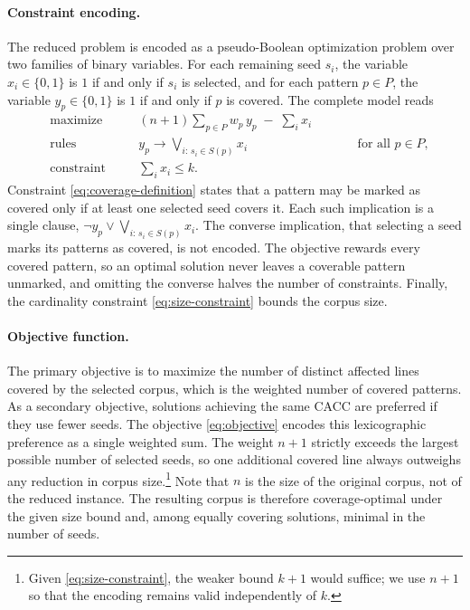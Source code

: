 \paragraph{Constraint encoding.}
The reduced problem is encoded as a pseudo-Boolean optimization problem over two families of binary variables.
For each remaining seed $s_i$, the variable $x_i\in\{0,1\}$ is $1$ if and only if $s_i$ is selected, and for each pattern $p\in P$, the variable $y_p\in\{0,1\}$ is $1$ if and only if $p$ is covered.
The complete model reads
\begin{subequations}
  \label{eq:cpsat-model}
  \begin{alignat}{3}
    &\text{maximize}   &\quad& (n+1)\sum_{p\in P} w_p\, y_p \;-\; \sum_{i} x_i
      \label{eq:objective} \\
    &\text{rules}      &     & y_p \rightarrow \bigvee_{i:\,s_i\in S(p)} x_i
      &\qquad& \text{for all } p\in P,
      \label{eq:coverage-definition} \\
    &\text{constraint} &     & \sum_{i} x_i \leq k.
      \label{eq:size-constraint}
  \end{alignat}
\end{subequations}
Constraint \eqref{eq:coverage-definition} states that a pattern may be marked as covered only if at least one selected seed covers it.
Each such implication is a single clause, $\lnot y_p \lor \bigvee_{i:\,s_i\in S(p)} x_i$.
The converse implication, that selecting a seed marks its patterns as covered, is not encoded.
The objective rewards every covered pattern, so an optimal solution never leaves a coverable pattern unmarked, and omitting the converse halves the number of constraints.
Finally, the cardinality constraint \eqref{eq:size-constraint} bounds the corpus size.

\paragraph{Objective function.}
The primary objective is to maximize the number of distinct affected lines covered by the selected corpus, which is the weighted number of covered patterns.
As a secondary objective, solutions achieving the same \ac{CACC} are preferred if they use fewer seeds.
The objective \eqref{eq:objective} encodes this lexicographic preference as a single weighted sum.
The weight $n+1$ strictly exceeds the largest possible number of selected seeds, so one additional covered line always outweighs any reduction in corpus size.\footnote{Given \eqref{eq:size-constraint}, the weaker bound $k+1$ would suffice; we use $n+1$ so that the encoding remains valid independently of $k$.}
Note that $n$ is the size of the original corpus, not of the reduced instance.
The resulting corpus is therefore coverage-optimal under the given size bound and, among equally covering solutions, minimal in the number of seeds.

